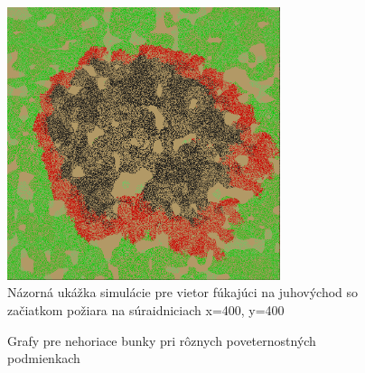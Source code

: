 \documentclass[a4paper,12pt]{article}
\begin{document}
\begin{figure}[htp]
    \centering
    \includegraphics[width=8cm]{se.png}
    \caption{Názorná ukážka simulácie pre vietor fúkajúci na juhovýchod so začiatkom požiara na súraidniciach x=400, y=400}
\end{figure}

\FloatBarrier
\begin{figure}
    \centering
    \qquad
    \caption{Grafy pre nehoriace bunky pri rôznych poveternostných podmienkach}

    \label{fig:not_burning}
\end{figure}
\end{document}
